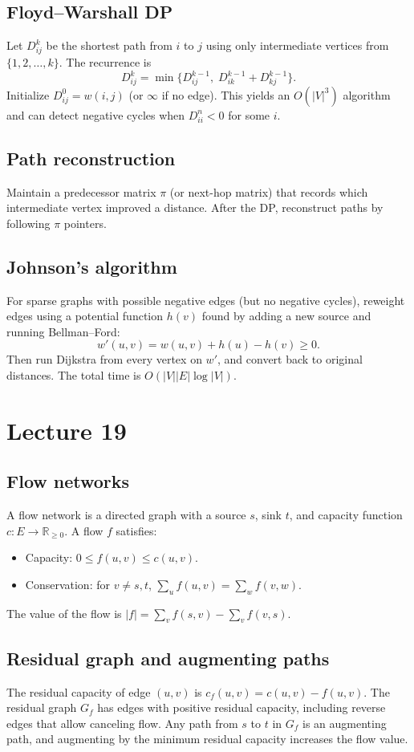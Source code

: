 \documentclass[11pt]{article}
\begin{document}
{{{{\subsection*{Floyd--Warshall DP}
Let $D^k_{ij}$ be the shortest path from $i$ to $j$ using only intermediate vertices from
$\{1,2,\ldots,k\}$. The recurrence is
\[
D^k_{ij} = \min\{D^{k-1}_{ij},\; D^{k-1}_{ik} + D^{k-1}_{kj}\}.
\]
Initialize $D^0_{ij}=w(i,j)$ (or $\infty$ if no edge). This yields an $O(|V|^3)$ algorithm and can
detect negative cycles when $D^n_{ii} < 0$ for some $i$.

\subsection*{Path reconstruction}
Maintain a predecessor matrix $\pi$ (or next-hop matrix) that records which intermediate vertex
improved a distance. After the DP, reconstruct paths by following $\pi$ pointers.

\subsection*{Johnson's algorithm}
For sparse graphs with possible negative edges (but no negative cycles), reweight edges using a
potential function $h(v)$ found by adding a new source and running Bellman--Ford:
\[
w'(u,v) = w(u,v) + h(u) - h(v) \ge 0.
\]
Then run Dijkstra from every vertex on $w'$, and convert back to original distances. The total
time is $O(|V||E|\log |V|)$.

\section{Lecture 19}

\subsection*{Flow networks}
A flow network is a directed graph with a source $s$, sink $t$, and capacity function
$c:E\to\mathbb{R}_{\ge 0}$. A flow $f$ satisfies:
\begin{itemize}
\item Capacity: $0 \le f(u,v) \le c(u,v)$.
\item Conservation: for $v \ne s,t$, $\sum_u f(u,v) = \sum_w f(v,w)$.
\end{itemize}
The value of the flow is $|f| = \sum_v f(s,v) - \sum_v f(v,s)$.

\subsection*{Residual graph and augmenting paths}
The residual capacity of edge $(u,v)$ is $c_f(u,v)=c(u,v)-f(u,v)$. The residual graph $G_f$ has
edges with positive residual capacity, including reverse edges that allow canceling flow. Any
path from $s$ to $t$ in $G_f$ is an augmenting path, and augmenting by the minimum residual
capacity increases the flow value.

}}}}
\end{document}
